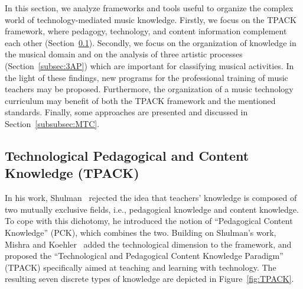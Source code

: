 \documentclass[10pt,journal,compsoc]{IEEEtran}
\begin{document}
In this section, we analyze frameworks and tools useful to organize the complex world of technology-mediated music knowledge. Firstly, we focus on the TPACK framework, where pedagogy, technology, and content information complement each other (Section~\ref{subsec:TPACK}). Secondly, we focus on the organization of knowledge in the musical domain and on the analysis of three artistic processes (Section~\ref{subsec:3AP}) which are important for classifying musical activities. In the light of these findings, new programs for the professional training of music teachers may be proposed. Furthermore, the organization of a music technology curriculum may benefit of both the TPACK framework and the mentioned standards. Finally, some approaches are presented and discussed in Section~\ref{subsubsec:MTC}.

\subsection{Technological Pedagogical and Content Knowledge (TPACK)}
\label{subsec:TPACK}

In his work, Shulman~\cite{shulman1986those} rejected the idea that teachers' knowledge is composed of two mutually exclusive fields, i.e., pedagogical knowledge and content knowledge. To cope with this dichotomy, he introduced the notion of ``Pedagogical Content Knowledge'' (PCK), which combines the two.
Building on Shulman's work, Mishra and Koehler~\cite{koehler2009technological} added the technological dimension to the framework, and proposed the ``Technological and Pedagogical Content Knowledge Paradigm'' (TPACK) specifically aimed at teaching and learning with technology. The resulting seven discrete types of knowledge are depicted in Figure~\ref{fig:TPACK}.
\end{document}
